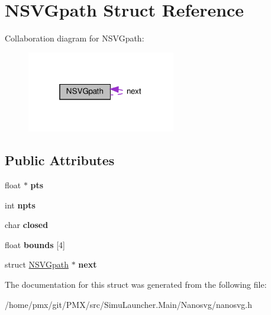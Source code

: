 \hypertarget{structNSVGpath}{}\section{N\+S\+V\+Gpath Struct Reference}
\label{structNSVGpath}


Collaboration diagram for N\+S\+V\+Gpath\+:
\nopagebreak
\begin{figure}[H]
\begin{center}
\leavevmode
\includegraphics[width=184pt]{structNSVGpath__coll__graph}
\end{center}
\end{figure}
\subsection*{Public Attributes}
\begin{DoxyCompactItemize}
\item 
\mbox{\label{structNSVGpath_a1ee7c57cdb0d1af644617ebe66594677}} 
float $\ast$ {\bfseries pts}
\item 
\mbox{\label{structNSVGpath_a45f685f06ac09e453f64b558c7b4562d}} 
int {\bfseries npts}
\item 
\mbox{\label{structNSVGpath_a23aa888bcee2377a97258eb8abe3cf3f}} 
char {\bfseries closed}
\item 
\mbox{\label{structNSVGpath_ac39f3994b2a616ad40ad7e02fb669cc1}} 
float {\bfseries bounds} \mbox{[}4\mbox{]}
\item 
\mbox{\label{structNSVGpath_aa0bfc833298d4d05cfb34a9d814a2c2d}} 
struct \hyperlink{structNSVGpath}{N\+S\+V\+Gpath} $\ast$ {\bfseries next}
\end{DoxyCompactItemize}


The documentation for this struct was generated from the following file\+:\begin{DoxyCompactItemize}
\item 
/home/pmx/git/\+P\+M\+X/src/\+Simu\+Launcher.\+Main/\+Nanosvg/nanosvg.\+h\end{DoxyCompactItemize}
